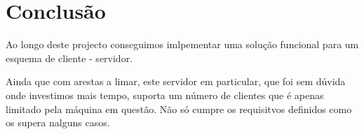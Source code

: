\section{Conclusão\label{sec:Conclusao}}

	\indent\indent Ao longo deste projecto conseguimos imlpementar uma solução funcional para um esquema de cliente - servidor.
	
	Ainda que com arestas a limar, este servidor em particular, que foi sem dúvida onde investimos mais tempo, suporta um número de clientes que é apenas limitado pela máquina em questão.
	Não só cumpre os requisitvos definidos como os supera nalguns casos.
	
	

\clearpage